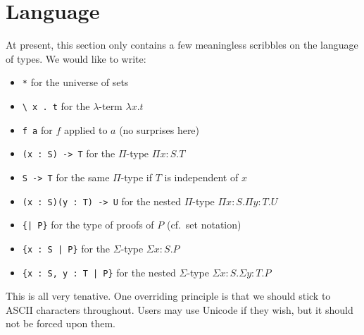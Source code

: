 \section{Language}

At present, this section only contains a few meaningless scribbles on the 
language of types. We would like to write:

\begin{itemize}
\item \verb|*| for the universe of sets
\item \verb!\ x . t! for the $\lambda$-term $\lambda x.t$
\item \verb|f a| for $f$ applied to $a$ (no surprises here)
\item \verb!(x : S) -> T! for the $\Pi$-type $\Pi x:S. T$
\item \verb!S -> T! for the same $\Pi$-type if $T$ is independent of $x$
\item \verb!(x : S)(y : T) -> U! for the nested $\Pi$-type $\Pi x:S. \Pi y:T. U$
\item \verb!{| P}! for the type of proofs of $P$ (cf.\ set notation)
\item \verb!{x : S | P}! for the $\Sigma$-type $\Sigma x:S. P$
\item \verb!{x : S, y : T | P}! for the nested $\Sigma$-type $\Sigma x:S. \Sigma y:T. P$
\end{itemize}

This is all very tenative. One overriding principle is that we should stick to ASCII
characters throughout. Users may use Unicode if they wish, but it should not be
forced upon them.
